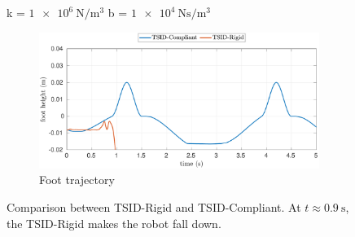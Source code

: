 \begin{figure}[!t]
\begin{myframe}{k = $\SI{1e6}{\newton \per \meter^3}$  b = $\SI{1e4}{\newton \second \per \meter^3}$}
     \begin{subfigure}[b]{0.49\textwidth}
        \centering
        \includegraphics[height=0.151\textheight]{chapter_compliant_contact/figures/compliant_1e6_1e4_3_stiff_1e6_1e4_2_foot.pdf}
        \caption{Foot trajectory}
        \label{fig:1e6_1e4_foot}
    \end{subfigure}
    \end{myframe}
    \caption{Comparison between TSID-Rigid and TSID-Compliant. At $t\approx \SI{0.9}{\second}$, the TSID-Rigid makes the robot fall down.}
\end{figure}
